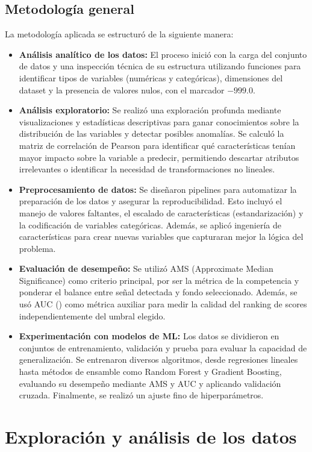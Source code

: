 \documentclass{article}
\begin{document}
\subsection{Metodología general}
La metodología aplicada se estructuró de la siguiente manera:
\begin{itemize}
    \item \textbf{Análisis analítico de los datos:} El proceso inició con la carga del conjunto de datos y una inspección técnica de su estructura utilizando funciones para identificar tipos de variables (numéricas y categóricas), dimensiones del dataset y la presencia de valores nulos, con el marcador $-999.0$. 
    \item \textbf{Análisis exploratorio:} Se realizó una exploración profunda mediante visualizaciones y estadísticas descriptivas para ganar conocimientos sobre la distribución de las variables y detectar posibles anomalías. Se calculó la matriz de correlación de Pearson para identificar qué características tenían mayor impacto sobre la variable a predecir, permitiendo descartar atributos irrelevantes o identificar la necesidad de transformaciones no lineales.
    \item \textbf{Preprocesamiento de datos:} Se diseñaron  pipelines para automatizar la preparación de los datos y asegurar la reproducibilidad. Esto incluyó el manejo de valores faltantes, el escalado de características (estandarización) y la codificación de variables categóricas. Además, se aplicó ingeniería de características para crear nuevas variables que capturaran mejor la lógica del problema.
    \item \textbf{Evaluación de desempeño:} Se utilizó AMS (Approximate Median Significance) como criterio principal, por ser la métrica de la competencia y ponderar el balance entre señal detectada y fondo seleccionado. Además, se usó AUC () como métrica auxiliar para medir la calidad del ranking de scores independientemente del umbral elegido.
    \item \textbf{Experimentación con modelos de ML:} Los datos se dividieron en conjuntos de entrenamiento, validación y prueba para evaluar la capacidad de generalización. Se entrenaron diversos algoritmos, desde regresiones lineales hasta métodos de ensamble como Random Forest y Gradient Boosting, evaluando su desempeño mediante AMS y AUC y aplicando validación cruzada. Finalmente, se realizó un ajuste fino de hiperparámetros.    
\end{itemize}

\section{Exploración y análisis de los datos}
\end{document}
